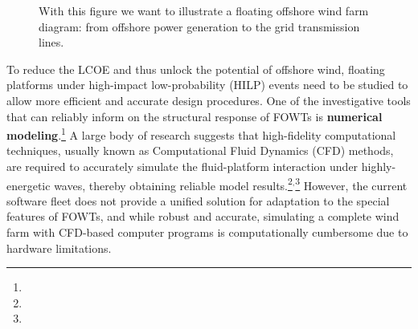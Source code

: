 \begin{figure}[hbt!]
  \centering
  
    \vspace{-2ex}
  \caption{\small With this figure we want to illustrate a floating offshore wind farm diagram: from offshore power generation to the grid transmission lines.}
  \vspace{-2ex}
  \label{fig:awesome}
\end{figure}





To reduce the LCOE and thus unlock the potential of offshore wind, floating platforms under high-impact low-probability (HILP) events need to be studied to allow more efficient and accurate design procedures. One of the investigative tools that can reliably inform on the structural response of FOWTs is \textbf{numerical modeling}.\footnote{} A large body of research suggests that high-fidelity computational techniques, usually known as Computational Fluid Dynamics (CFD) methods, are required to accurately simulate the fluid-platform interaction under highly-energetic waves, thereby obtaining reliable model results.\footnote{}$^,$\footnote{} However, the current software fleet does not provide a unified solution for adaptation to the special features of FOWTs, and while robust and accurate, simulating a complete wind farm with CFD-based computer programs is computationally cumbersome due to hardware limitations.

